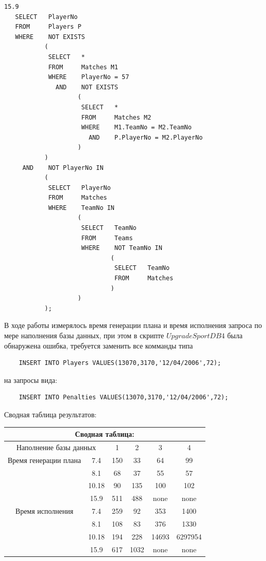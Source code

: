 \documentclass[a4paper,12pt]{article}
\begin{document}
\begin{lstlisting}
15.9
   SELECT   PlayerNo
   FROM     Players P
   WHERE    NOT EXISTS 
           (
            SELECT   *
            FROM     Matches M1
            WHERE    PlayerNo = 57
              AND    NOT EXISTS 
                    (
                     SELECT   *
                     FROM     Matches M2
                     WHERE    M1.TeamNo = M2.TeamNo
                       AND    P.PlayerNo = M2.PlayerNo
                    )
           )
     AND    NOT PlayerNo IN 
           (
            SELECT   PlayerNo
            FROM     Matches
            WHERE    TeamNo IN 
                    (
                     SELECT   TeamNo
                     FROM     Teams
                     WHERE    NOT TeamNo IN 
                             (
                              SELECT   TeamNo
                              FROM     Matches
                             )
                    )
           );
\end{lstlisting}

В ходе работы измерялось время генерации плана и время исполнения запроса по мере наполнения базы данных,
при этом в скрипте $UpgradeSportDB4$ была обнаружена ошибка, требуется заменить все комманды типа
\begin{lstlisting}
	INSERT INTO Players VALUES(13070,3170,'12/04/2006',72);
\end{lstlisting}
на запросы вида:
\begin{lstlisting}
	INSERT INTO Penalties VALUES(13070,3170,'12/04/2006',72);
\end{lstlisting}

Сводная таблица результатов:

\begin{tabular}[t]{|c|c|c|c|c|c|}
\hline
\multicolumn{6}{|c|}{Сводная таблица:}\\
\hline
\multicolumn{2}{|c|}{Наполнение базы данных} & 1 & 2 & 3 & 4\\
\hline
Время генерации плана
& 7.4    & 150    & 33     & 64     & 99      \\ \cline{2-6}
& 8.1    & 68     & 37     & 55     & 57      \\ \cline{2-6}
& 10.18  & 90     & 135    & 100    & 102     \\ \cline{2-6}
& 15.9   & 511    & 488    & none   & none    \\ \cline{2-6}
\hline
Время исполнения
& 7.4    & 259    & 92     & 353    & 1400    \\ \cline{2-6}
& 8.1    & 108    & 83     & 376    & 1330    \\ \cline{2-6}
& 10.18  & 194    & 228    & 14693  & 6297954 \\ \cline{2-6}
& 15.9   & 617    & 1032   & none   & none    \\ \cline{2-6}
\hline
\end{tabular}
\end{document}
